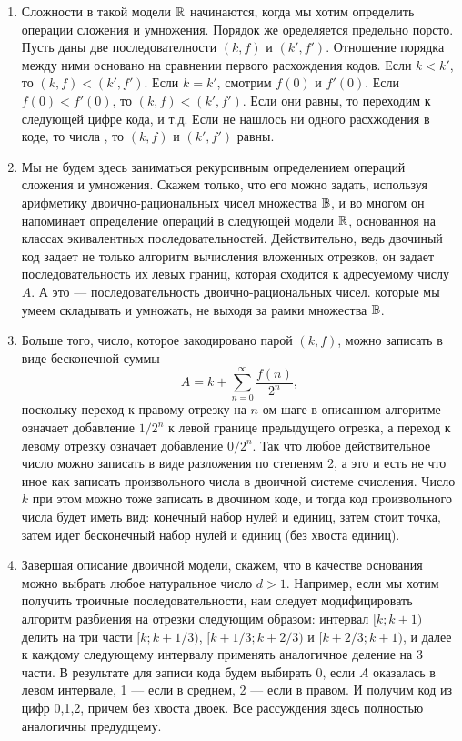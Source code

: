 \begin{enumerate}
\item Сложности в такой модели $\mathbb R$ начинаются, когда мы хотим определить операции сложения и умножения. Порядок же оределяется предельно порсто. Пусть даны две последователности $(k,f)$ и $(k',f')$. Отношение порядка между ними основано на сравнении первого расхождения кодов. Если $k<k'$, то $(k,f)<(k',f')$. Если $k=k'$, смотрим $f(0)$ и $f'(0)$. Если $f(0)<f'(0)$, то $(k,f)<(k',f')$. Если они равны, то переходим к следующей цифре кода, и т.д. Если не нашлось ни одного расхжодения в коде, то числа , то $(k,f)$ и $(k',f')$ равны.
\item Мы не будем здесь заниматься рекурсивным определением операций сложения и умножения. Скажем только, что его можно задать, используя арифметику двоично-рациональных чисел множества $\mathbb B$, и во многом он напоминает определение операций в следующей модели $\mathbb R$, основанноя на классах экивалентных последовательностей. Действительно, ведь двочиный код задает не только алгоритм вычисления вложенных отрезков, он задает последовательность их левых границ, которая сходится к адресуемому числу $A$. А это --- последовательность двоично-рациональных чисел. которые мы умеем складывать и умножать, не выходя за рамки множества $\mathbb B$.
\item Больше того, число, которое закодировано парой $(k,f)$, можно записать в виде бесконечной суммы
$$
A = k+\sum_{n=0}^\infty\frac{f(n)}{2^n},
$$
поскольку переход к правому отрезку на $n$-ом шаге в описанном алгоритме означает добавление $1/2^n$ к левой границе предыдущего отрезка, а переход к левому отрезку означает добавление $0/2^n$. Так что любое действительное число можно записать в виде разложения по степеням 2, а это и есть не что иное как записать произвольного числа в двоичной системе счисления. Число $k$ при этом можно тоже записать в двочином коде, и тогда код произвольного числа будет иметь вид: конечный набор нулей и единиц, затем стоит точка, затем идет бесконечный набор нулей и единиц (без хвоста единиц).
\item Завершая описание двоичной модели, скажем, что в качестве основания можно выбрать любое натуральное число $d>1$. Например, если мы хотим получить троичные последовательности, нам следует модифицировать алгоритм разбиения на отрезки следующим образом: интервал $[k;k+1)$ делить на три части $[k;k+1/3)$, $[k+1/3;k+2/3)$ и $[k+2/3;k+1)$, и далее к каждому следующему интервалу применять аналогичное деление на 3 части. В результате для записи кода будем выбирать 0, если $A$ оказалась в левом интервале, 1 --- если в среднем, 2 --- если в правом. И получим код из цифр 0,1,2, причем без хвоста двоек. Все рассуждения здесь полностью аналогичны предудщему.

\end{enumerate}
